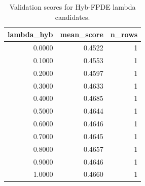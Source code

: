 \begin{table}[t]
\caption{Validation scores for Hyb-FPDE lambda candidates.}
\label{tab:lambda_distribution_computed}
\centering
\begin{tabular}{rrr}
\toprule
lambda\_hyb & mean\_score & n\_rows \\
\midrule
0.0000 & 0.4522 & 1 \\
0.1000 & 0.4553 & 1 \\
0.2000 & 0.4597 & 1 \\
0.3000 & 0.4633 & 1 \\
0.4000 & 0.4685 & 1 \\
0.5000 & 0.4644 & 1 \\
0.6000 & 0.4646 & 1 \\
0.7000 & 0.4645 & 1 \\
0.8000 & 0.4657 & 1 \\
0.9000 & 0.4646 & 1 \\
1.0000 & 0.4660 & 1 \\
\bottomrule
\end{tabular}

\end{table}
